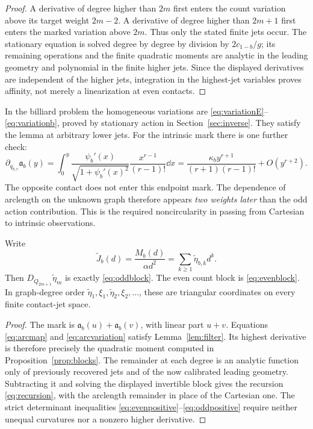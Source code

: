 \begin{proof}
A derivative of degree higher than $2m$ first enters the count variation
above its target weight $2m-2$. A derivative of degree higher than
$2m+1$ first enters the marked variation above $2m$. Thus only the
stated finite jets occur. The stationary equation is solved degree by
degree by division by $2c_{1-b}/g$; its remaining operations and the
finite quadratic moments are analytic in the leading geometry and
polynomial in the finite higher jets. Since the displayed derivatives
are independent of the higher jets, integration in the highest-jet
variables proves affinity, not merely a linearization at even contacts.
\end{proof}

In the billiard problem the homogeneous variations are
\eqref{eq:variationE}--\eqref{eq:variationb}, proved by stationary
action in Section~\ref{sec:inverse}. They satisfy the lemma at arbitrary
lower jets. For the intrinsic mark there is one further check:
\begin{equation}\label{eq:arcvariation}
 \partial_{q_{b,r}}\mathfrak a_b(y)
 =\int_0^y\frac{\psi_b'(x)}{\sqrt{1+\psi_b'(x)^2}}
                    \frac{x^{r-1}}{(r-1)!}\dd x
 =\frac{\kappa_b y^{r+1}}{(r+1)(r-1)!}+O(y^{r+2}).
\end{equation}
The opposite contact does not enter this endpoint mark. The dependence
of arclength on the unknown graph therefore appears \emph{two weights
later} than the odd action contribution. This is the required
noncircularity in passing from Cartesian to intrinsic observations.

\begin{proposition}\label{prop:arcinverse}
Write
\begin{equation}\label{eq:arcseries}
 \widetilde J_b(d)=\frac{M_b(d)}{\alpha d^2}
               =\sum_{k\ge1}\widetilde\eta_{b,k}d^k.
\end{equation}
Then $D_{Q_{2m+1}}\widetilde\eta_m$ is exactly
\eqref{eq:oddblock}. The even count block is \eqref{eq:evenblock}.
In graph-degree order
$\widetilde\eta_1,\xi_1,\widetilde\eta_2,\xi_2,\ldots$,
these are triangular coordinates on every finite contact-jet space.
\end{proposition}
\begin{proof}
The mark is $\mathfrak a_b(u)+\mathfrak a_b(v)$, with linear part
$u+v$. Equations \eqref{eq:arcmap} and \eqref{eq:arcvariation} satisfy
Lemma~\ref{lem:filter}. Its highest derivative is therefore precisely
the quadratic moment computed in Proposition~\ref{prop:blocks}.
The remainder at each degree is an analytic function only of previously
recovered jets and of the now calibrated leading geometry. Subtracting
it and solving the displayed invertible block gives the recursion
\eqref{eq:recursion}, with the arclength remainder in place of the
Cartesian one. The strict determinant inequalities
\eqref{eq:evenpositive}--\eqref{eq:oddpositive} require neither unequal
curvatures nor a nonzero higher derivative.
\end{proof}

